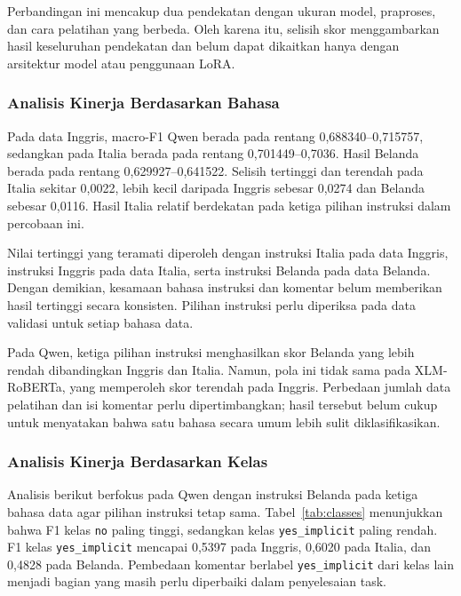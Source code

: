 \documentclass[11pt]{article}
\begin{document}
Perbandingan ini mencakup dua pendekatan dengan ukuran model, praproses, dan cara pelatihan yang berbeda. Oleh karena itu, selisih skor menggambarkan hasil keseluruhan pendekatan dan belum dapat dikaitkan hanya dengan arsitektur model atau penggunaan LoRA.

\subsubsection{Analisis Kinerja Berdasarkan Bahasa}
Pada data Inggris, macro-F1 Qwen berada pada rentang 0,688340--0,715757, sedangkan pada Italia berada pada rentang 0,701449--0,7036. Hasil Belanda berada pada rentang 0,629927--0,641522. Selisih tertinggi dan terendah pada Italia sekitar 0,0022, lebih kecil daripada Inggris sebesar 0,0274 dan Belanda sebesar 0,0116. Hasil Italia relatif berdekatan pada ketiga pilihan instruksi dalam percobaan ini.

Nilai tertinggi yang teramati diperoleh dengan instruksi Italia pada data Inggris, instruksi Inggris pada data Italia, serta instruksi Belanda pada data Belanda. Dengan demikian, kesamaan bahasa instruksi dan komentar belum memberikan hasil tertinggi secara konsisten. Pilihan instruksi perlu diperiksa pada data validasi untuk setiap bahasa data.

Pada Qwen, ketiga pilihan instruksi menghasilkan skor Belanda yang lebih rendah dibandingkan Inggris dan Italia. Namun, pola ini tidak sama pada XLM-RoBERTa, yang memperoleh skor terendah pada Inggris. Perbedaan jumlah data pelatihan dan isi komentar perlu dipertimbangkan; hasil tersebut belum cukup untuk menyatakan bahwa satu bahasa secara umum lebih sulit diklasifikasikan.

\subsubsection{Analisis Kinerja Berdasarkan Kelas}
Analisis berikut berfokus pada Qwen dengan instruksi Belanda pada ketiga bahasa data agar pilihan instruksi tetap sama. Tabel~\ref{tab:classes} menunjukkan bahwa F1 kelas \texttt{no} paling tinggi, sedangkan kelas \texttt{yes\_implicit} paling rendah. F1 kelas \texttt{yes\_implicit} mencapai 0,5397 pada Inggris, 0,6020 pada Italia, dan 0,4828 pada Belanda. Pembedaan komentar berlabel \texttt{yes\_implicit} dari kelas lain menjadi bagian yang masih perlu diperbaiki dalam penyelesaian task.
\end{document}
